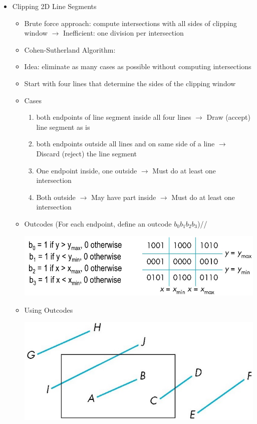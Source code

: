 \documentclass[11pt,a4paper]{article}
\begin{document}
\begin{itemize}
\begin{itemize}
				\end{itemize}
			\item Clipping 2D Line Segments
				\begin{itemize}
					\item Brute force approach: compute intersections with all sides of clipping window
					$\rightarrow$ Inefficient: one division per intersection
					\item Cohen-Sutherland Algorithm:
					\item Idea: eliminate as many cases as possible without computing intersections
					\item Start with four lines that determine the sides of the clipping window
					\item Cases
						\begin{enumerate}
							\item both endpoints of line segment inside all four lines $\rightarrow$ Draw (accept) line segment as is
							\item both endpoints outside all lines and on same side of a line $\rightarrow$ Discard (reject) the line segment
							\item One endpoint inside, one outside $\rightarrow$ Must do at least one intersection
							\item Both outside $\rightarrow$ May have part inside $\rightarrow$ Must do at least one intersection
						\end{enumerate}
					\item Outcodes (For each endpoint, define an outcode $b_0b_1b_2b_3$)//
					\begin{center}
						\includegraphics[scale=0.3]{pictures/DefOutcodes.jpg}
					\end{center}
					\item Using Outcodes\\
						\begin{center}
							\includegraphics[scale=0.3]{pictures/UseingOutcodes.jpg}

\end{center}
\end{itemize}
\end{itemize}
\end{document}
